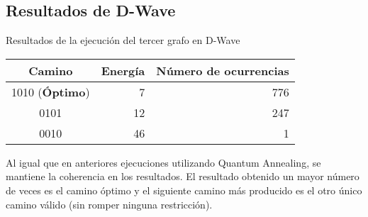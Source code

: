 \subsection{Resultados de D-Wave}
\begin{table}[htbp]{}{Resultados de la ejecución del tercer grafo en D-Wave}
  \centering
  \begin{tabular}{|c|r|r|}
    \hline
    \textbf{Camino} & \textbf{Energía} & \textbf{Número de ocurrencias} \\ \hline
    1010 (\textbf{Óptimo}) &  7 & 776 \\ \hline
    0101                   & 12 & 247 \\ \hline
    0010                   & 46 &   1 \\ \hline
  \end{tabular}
\end{table}

Al igual que en anteriores ejecuciones utilizando Quantum Annealing, se mantiene la coherencia en los resultados. El resultado obtenido un mayor número de veces es el camino óptimo y el siguiente camino más producido es el otro único camino válido (sin romper ninguna restricción).

